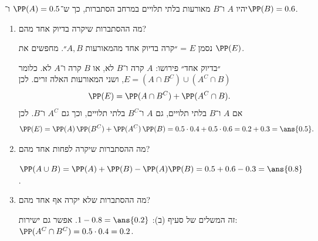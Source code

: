 יהיו $A$ ו־$B$ מאורעות בלתי תלויים במרחב הסתברות, כך ש־$\PP(A)=0.5$ ו־$\PP(B)=0.6$.
\begin{enumerate}
\item מה ההסתברות שיקרה בדיוק אחד מהם?
\begin{solbox}
נסמן $E$ = ״קרה בדיוק אחד מהמאורעות $A,B$״. מחפשים את $\PP(E)$.

״בדיוק אחד״ פירושו: $A$ קרה ו־$B$ לא, או $B$ קרה ו־$A$ לא. כלומר $E=(A\cap B^C)\cup(A^C\cap B)$, ושני המאורעות האלה זרים. לכן
\[
\PP(E)=\PP(A\cap B^C)+\PP(A^C\cap B).
\]
אם $A$ ו־$B$ בלתי תלויים, גם $A$ ו־$B^C$ בלתי תלויים, וכך גם $A^C$ ו־$B$. לכן
\[
\PP(E)=\PP(A)\,\PP(B^C)+\PP(A^C)\,\PP(B)=0.5\cdot0.4+0.5\cdot0.6=0.2+0.3=\ans{0.5}.
\]
\end{solbox}
\item מה ההסתברות שיקרה לפחות אחד מהם?
\begin{solbox}
$\PP(A\cup B)=\PP(A)+\PP(B)-\PP(A)\PP(B)=0.5+0.6-0.3=\ans{0.8}$.
\end{solbox}
\item מה ההסתברות שלא יקרה אף אחד מהם?
\begin{solbox}
זה המשלים של סעיף (ב): $1-0.8=\ans{0.2}$. אפשר גם ישירות: $\PP(A^C\cap B^C)=0.5\cdot0.4=0.2$.
\end{solbox}
\end{enumerate}
